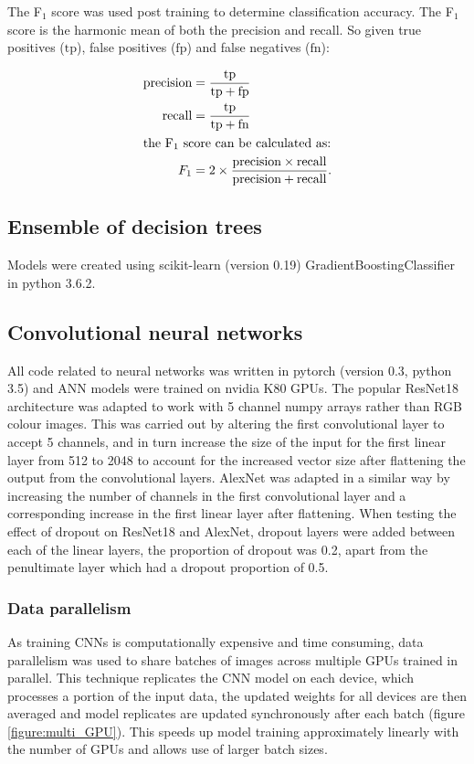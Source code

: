 \documentclass[a4paper,11pt,twoside,openright]{scrbook}
\begin{document}
The F$_1$ score was used post training to determine classification accuracy.
The F$_1$ score is the harmonic mean of both the precision and recall.
So given true positives ($\text{tp}$), false positives ($\text{fp}$) and false negatives ($\text{fn}$):

\begin{align}
        \text{precision} &= \frac{ \text{tp} }{ \text{tp} + \text{fp} } \\
        \text{recall} &= \frac{\text{tp}}{\text{tp} + \text{fn}} \\
        \intertext{the F$_1$ score can be calculated as:}
        F_1 &= 2 \times \frac{\text{precision} \times \text{recall}}{\text{precision} + \text{recall}}.
\end{align}

\subsection{Ensemble of decision trees}
Models were created using scikit-learn (version 0.19) GradientBoostingClassifier in python 3.6.2.

\subsection{Convolutional neural networks}


All code related to neural networks was written in pytorch (version 0.3, python 3.5) and ANN models were trained on nvidia K80 GPUs.
The popular ResNet18 architecture was adapted to work with 5 channel numpy arrays rather than RGB colour images.
This was carried out by altering the first convolutional layer to accept 5 channels, and in turn increase the size of the input for the first linear layer from 512 to 2048 to account for the increased vector size after flattening the output from the convolutional layers.
AlexNet was adapted in a similar way by increasing the number of channels in the first convolutional layer and a corresponding increase in the first linear layer after flattening.
When testing the effect of dropout on ResNet18 and AlexNet, dropout layers were added between each of the linear layers, the proportion of dropout was 0.2, apart from the penultimate layer which had a dropout proportion of 0.5.


\subsubsection{Data parallelism}
As training CNNs is computationally expensive and time consuming, data parallelism was used to share batches of images across multiple GPUs trained in parallel.
This technique replicates the CNN model on each device, which processes a portion of the input data, the updated weights for all devices are then averaged and model replicates are updated synchronously after each batch (figure \ref{figure:multi_GPU}).
This speeds up model training approximately linearly with the number of GPUs and allows use of larger batch sizes.
\end{document}
